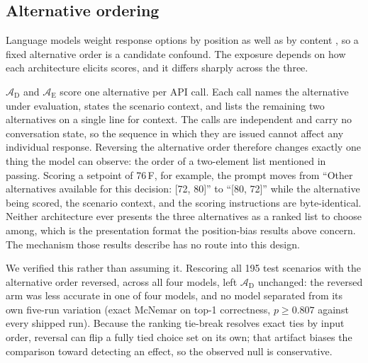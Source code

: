 
\subsection{Alternative ordering}
\label{sec:alternative-order}

Language models weight response options by position as well as by content
\cite{wang2024fairescalers,zheng2023judging}, so a fixed alternative order is a
candidate confound. The exposure depends on how each architecture elicits
scores, and it differs sharply across the three.

$\mathcal{A}_{\text{D}}$ and $\mathcal{A}_{\text{E}}$ score one alternative per
API call. Each call names the alternative under evaluation, states the scenario
context, and lists the remaining two alternatives on a single line for context.
The calls are independent and carry no conversation state, so the sequence in
which they are issued cannot affect any individual response. Reversing the
alternative order therefore changes exactly one thing the model can observe:
the order of a two-element list mentioned in passing. Scoring a setpoint of
76\,\textdegree F, for example, the prompt moves from ``Other alternatives
available for this decision: [72, 80]'' to ``[80, 72]'' while the alternative
being scored, the scenario context, and the scoring instructions are
byte-identical. Neither architecture ever presents the three alternatives as a
ranked list to choose among, which is the presentation format the position-bias
results above concern. The mechanism those results describe has no route into
this design.

We verified this rather than assuming it. Rescoring all 195 test scenarios with
the alternative order reversed, across all four models, left
$\mathcal{A}_{\text{D}}$ unchanged: the reversed arm was less accurate in one of
four models, and no model separated from its own five-run variation (exact
McNemar on top-1 correctness, $p \geq 0.807$ against every shipped run). Because
the ranking tie-break resolves exact ties by input order, reversal can flip a
fully tied choice set on its own; that artifact biases the comparison toward
detecting an effect, so the observed null is conservative.

